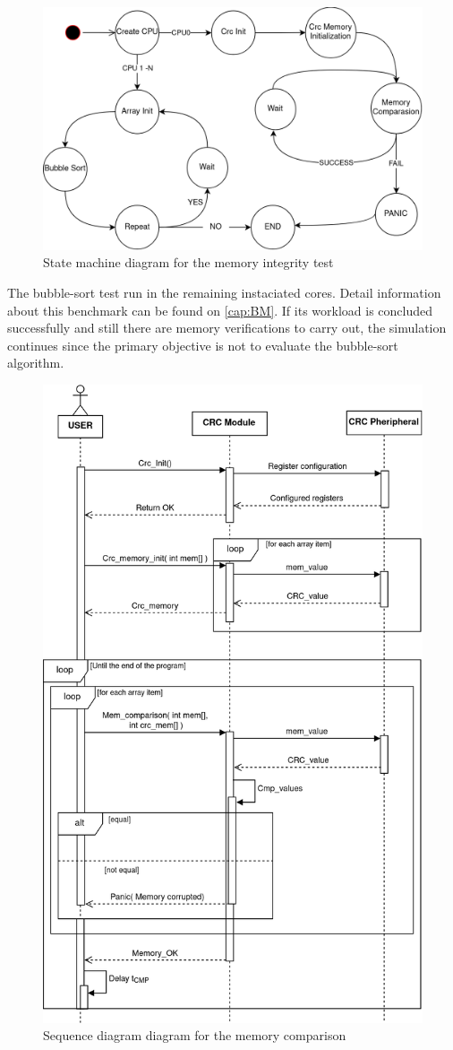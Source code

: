 \begin{figure}[H]
	\centering
 	\includegraphics[width=0.7\linewidth]{Images/MemoryIntegrity_StateDiagram.png}
 	\caption{State machine diagram for the memory integrity test}
	\label{fig_MemoryIntegrity_StateDiagram}
\end{figure}

The bubble-sort test run in the remaining instaciated cores. Detail information about this benchmark can be found on \autoref{cap:BM}.
If its workload is concluded successfully and still there are memory verifications to carry out, the simulation continues since 
the primary objective is not to evaluate the bubble-sort algorithm. 


\begin{figure}[H]
	\centering
 	\includegraphics[width=0.7\linewidth]{Images/MemoryIntegrity_CPU0SequenceDiagram.png}
 	\caption{Sequence diagram diagram for the memory comparison}
	\label{fig_MemoryIntegrity_CPU0SequenceDiagram}
\end{figure}

